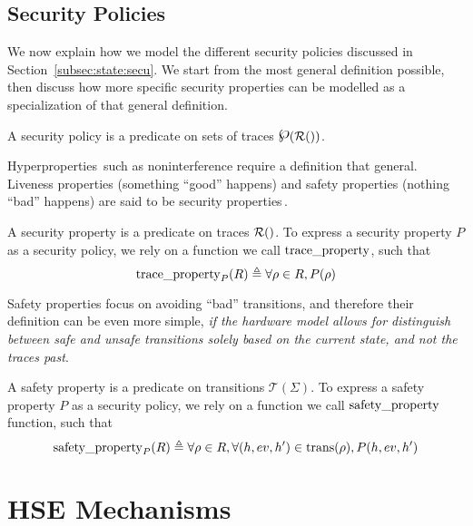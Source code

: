 \subsection{Security Policies}
\label{subsec:speccert:security}

We now explain how we model the different security policies discussed in
Section~\ref{subsec:state:secu}.
%
We start from the most general definition possible, then discuss how more
specific security properties can be modelled as a specialization of that general
definition.

\begin{definition}
  A security policy is a predicate on sets of traces
  $\powerset(\pathesLTS{Ez})$.
\end{definition}

Hyperproperties\,\cite{clarkson2010hyperproperties} such as noninterference
require a definition that general.
%
Liveness properties (something ``good'' happens) and safety properties (nothing
``bad'' happens) are said to be security
properties\,\cite{schneider2000enforceable}.

\begin{definition}
  A security property is a predicate on traces $\pathesLTS{Ez}$.
  To express a security property $P$ as a security policy, we rely on a function
  we call $\mathrm{trace\_property}$, such that
  \[
    \mathrm{trace\_property}_{P}(R) \triangleq \forall \rho \in R, P(\rho)
  \]
\end{definition}

Safety properties focus on avoiding ``bad'' transitions, and therefore their
definition can be even more simple, \emph{if the hardware model allows for
  distinguish between safe and unsafe transitions solely based on the current
  state, and not the traces past}.

\begin{definition}
  A safety property is a predicate on transitions $\mathcal{T}(\Sigma)$.
  To express a safety property $P$ as a security policy, we rely on a function
  we call $\mathrm{safety\_property}$ function, such that
  \[
    \mathrm{safety\_property}_{P}(R) \triangleq \forall \rho \in R, \forall (h,
    ev, h') \in \mathrm{trans}(\rho), P(h, ev, h')
  \]
\end{definition}

\section{HSE Mechanisms}
\label{sec:speccert:hse}

